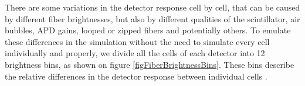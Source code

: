 \documentclass[12pt,a4paper]{article}
\begin{document}
There are some variations in the detector response cell by cell, that can be caused by different fiber brightnesses, but also by different qualities of the scintillator, air bubbles, APD gains, looped or zipped fibers and potentially others. To emulate these differences in the simulation without the need to simulate every cell individually and properly, we divide all the cells of each detector into 12 brightness bins, as shown on figure \ref{figFiberBrightnessBins}. These bins describe the relative differences in the detector response between individual cells \cite{NOVA-doc-34909}.

\end{document}
